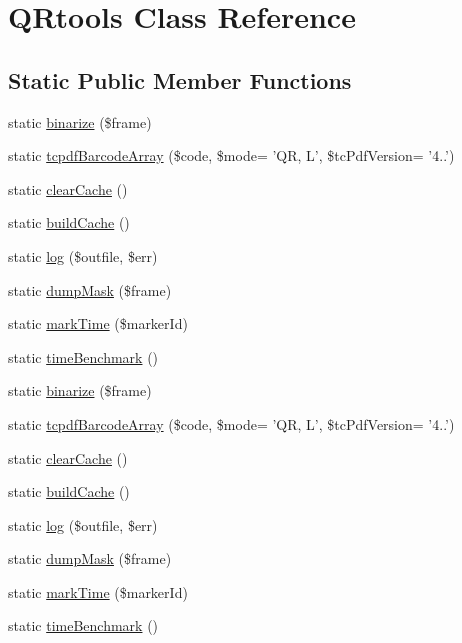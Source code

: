 \hypertarget{class_q_rtools}{\section{Q\-Rtools Class Reference}
\label{class_q_rtools}
}
\subsection*{Static Public Member Functions}
\begin{DoxyCompactItemize}
\item 
static \hyperlink{class_q_rtools_af6bf435694dfb6300a964a8a0fda273c}{binarize} (\$frame)
\item 
static \hyperlink{class_q_rtools_a46cb2d8044755b3dedac6801ca13373b}{tcpdf\-Barcode\-Array} (\$code, \$mode= 'Q\-R, L', \$tc\-Pdf\-Version= '4..')
\item 
static \hyperlink{class_q_rtools_af5b55597bf6435397d8a7f6f6b3a2fbc}{clear\-Cache} ()
\item 
static \hyperlink{class_q_rtools_aa52e49a390e2316dd7f224b889589630}{build\-Cache} ()
\item 
static \hyperlink{class_q_rtools_a16a87746b9481a139bf942ee664fe5db}{log} (\$outfile, \$err)
\item 
static \hyperlink{class_q_rtools_a195bbe095cd211dad988a7ae76c54983}{dump\-Mask} (\$frame)
\item 
static \hyperlink{class_q_rtools_acb9446b8ee2b723371fee1e8e0afb74a}{mark\-Time} (\$marker\-Id)
\item 
static \hyperlink{class_q_rtools_aff733ebd8161ea66c26e449eebb5316c}{time\-Benchmark} ()
\item 
static \hyperlink{class_q_rtools_af6bf435694dfb6300a964a8a0fda273c}{binarize} (\$frame)
\item 
static \hyperlink{class_q_rtools_a46cb2d8044755b3dedac6801ca13373b}{tcpdf\-Barcode\-Array} (\$code, \$mode= 'Q\-R, L', \$tc\-Pdf\-Version= '4..')
\item 
static \hyperlink{class_q_rtools_af5b55597bf6435397d8a7f6f6b3a2fbc}{clear\-Cache} ()
\item 
static \hyperlink{class_q_rtools_aa52e49a390e2316dd7f224b889589630}{build\-Cache} ()
\item 
static \hyperlink{class_q_rtools_a16a87746b9481a139bf942ee664fe5db}{log} (\$outfile, \$err)
\item 
static \hyperlink{class_q_rtools_a195bbe095cd211dad988a7ae76c54983}{dump\-Mask} (\$frame)
\item 
static \hyperlink{class_q_rtools_acb9446b8ee2b723371fee1e8e0afb74a}{mark\-Time} (\$marker\-Id)
\item 
static \hyperlink{class_q_rtools_aff733ebd8161ea66c26e449eebb5316c}{time\-Benchmark} ()
\end{DoxyCompactItemize}


